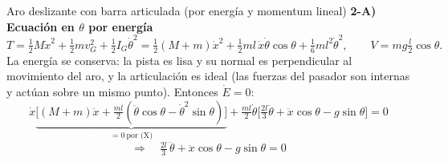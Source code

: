 \begin{solucion}{Aro deslizante con barra articulada (por energía y momentum lineal)}
\textbf{2-A) Ecuación en $\theta$ por energía}\\
\[
T = \tfrac12 M\dot x^2 + \tfrac12 m v_G^2 + \tfrac12 I_G\dot\theta^2
= \tfrac12(M+m)\dot x^2 + \tfrac12 ml\,\dot x\dot\theta\cos\theta + \tfrac16 ml^2\dot\theta^2,
\qquad V = mg\tfrac l2\cos\theta .
\]
La energía se conserva: la pista es lisa y su normal es perpendicular al movimiento del aro, y la articulación es ideal (las fuerzas del pasador son internas y actúan sobre un mismo punto). Entonces $\dot E=0$:
\[
\dot x\underbrace{\Big[(M+m)\ddot x + \tfrac{ml}{2}(\ddot\theta\cos\theta-\dot\theta^2\sin\theta)\Big]}_{=0\ \text{por (X)}}
+ \tfrac{ml}{2}\dot\theta\Big[\tfrac{2l}{3}\ddot\theta + \ddot x\cos\theta - g\sin\theta\Big] = 0
\]
\begin{equation*}
\Rightarrow\quad \tfrac{2l}{3}\,\ddot\theta + \ddot x\cos\theta - g\sin\theta = 0
\tag{$\Theta$}
\end{equation*}

\end{solucion}

